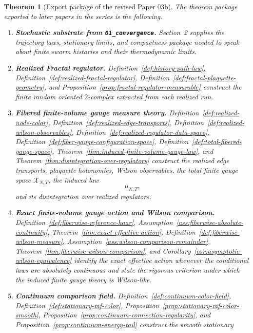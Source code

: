 \documentclass[11pt]{article}
\newtheorem{theorem}{Theorem}[section]
\theoremstyle{definition}
\theoremstyle{remark}
\begin{document}
\begin{theorem}[Export package of the revised Paper 03b]
\label{thm:paper2-export}
The theorem package exported to later papers in the series is the following.
\begin{enumerate}[leftmargin=1.5em,label=\textnormal{(\roman*)}]
\item \textbf{Stochastic substrate from \texttt{01\_convergence}.}
Section~2 supplies the trajectory laws, stationary limits, and compactness
package needed to speak about finite swarm histories and their thermodynamic
limits.
\item \textbf{Realized Fractal regulator.}
Definition~\ref{def:history-path-law},
Definition~\ref{def:realized-fractal-regulator},
Definition~\ref{def:fractal-plaquette-geometry}, and
Proposition~\ref{prop:fractal-regulator-measurable} construct the finite random
oriented \(2\)-complex extracted from each realized run.
\item \textbf{Fibered finite-volume gauge measure theory.}
Definition~\ref{def:realized-node-color},
Definition~\ref{def:realized-edge-transports},
Definition~\ref{def:realized-wilson-observables},
Definition~\ref{def:realized-regulator-data-space},
Definition~\ref{def:fiber-gauge-configuration-space},
Definition~\ref{def:total-fibered-gauge-space},
Theorem~\ref{thm:induced-finite-volume-gauge-law}, and
Theorem~\ref{thm:disintegration-over-regulators} construct the realized edge
transports, plaquette holonomies, Wilson observables, the total finite gauge
space \(\mathscr X_{N,T}\), the induced law
\[
\mu_{N,T},
\]
and its disintegration over realized regulators.
\item \textbf{Exact finite-volume gauge action and Wilson comparison.}
Definition~\ref{def:fiberwise-reference-haar},
Assumption~\ref{ass:fiberwise-absolute-continuity},
Theorem~\ref{thm:exact-effective-action},
Definition~\ref{def:fiberwise-wilson-measure},
Assumption~\ref{ass:wilson-comparison-remainder},
Theorem~\ref{thm:fiberwise-wilson-comparison}, and
Corollary~\ref{cor:asymptotic-wilson-equivalence} identify the exact
effective action whenever the conditional laws are absolutely continuous and
state the rigorous criterion under which the induced finite gauge theory is
Wilson-like.
\item \textbf{Continuum comparison field.}
Definition~\ref{def:continuum-color-field},
Definition~\ref{def:stationary-mf-color},
Proposition~\ref{prop:stationary-mf-color-smooth},
Proposition~\ref{prop:continuum-connection-regularity}, and
Proposition~\ref{prop:continuum-energy-tail} construct the smooth stationary

\end{enumerate}
\end{theorem}
\end{document}
